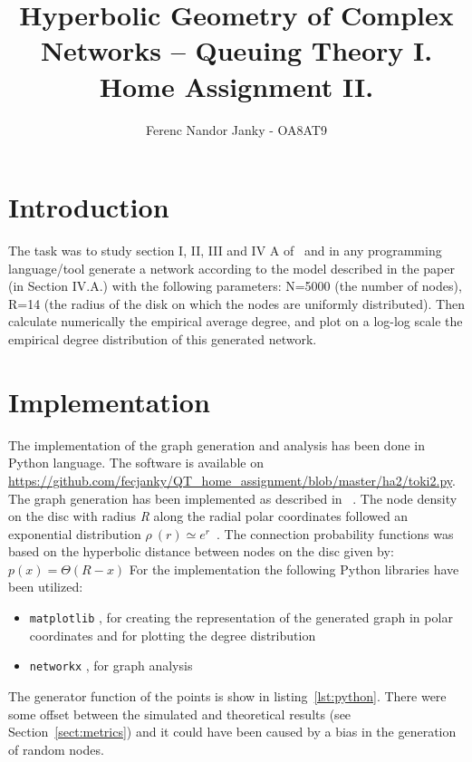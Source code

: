 \documentclass[a4paper]{article}
\title{Hyperbolic Geometry of Complex Networks – Queuing Theory I. Home Assignment II.}
\author{Ferenc Nandor Janky - OA8AT9}
\date{}
\begin{document}
\maketitle

\tableofcontents

\section{Introduction}

The task was to study section I, II, III and IV A of~\cite{HyperbolicGeoNetworks} and in any programming language/tool generate a network according to the model described in the paper 
(in Section IV.A.) with the following parameters: N=5000 (the number of nodes), R=14 (the radius of the disk on which the nodes are uniformly distributed). Then calculate numerically the empirical average degree, and plot on a log-log scale the empirical degree distribution of this generated network.

\section{Implementation}
The implementation of the graph generation and analysis has been done in Python language. The software is available on \url{https://github.com/fecjanky/QT_home_assignment/blob/master/ha2/toki2.py}.
The graph generation has been implemented as described in ~\cite{HyperbolicGeoNetworks}. The node density on the disc with radius \emph{R} along the radial polar coordinates followed an exponential distribution $ \rho~(r) \simeq e^r $~.
The connection probability functions was based on the hyperbolic distance between nodes on the disc given by: $ p(x) = \Theta(R - x) $
For the implementation the following Python libraries have been utilized:
\begin{itemize}
\item \verb!matplotlib! , for creating the representation of the generated graph in polar coordinates and for plotting the degree distribution
\item \verb!networkx! , for graph analysis
\end{itemize}

The  generator function of the points is show in listing~\ref{lst:python}. There were some offset between the simulated and theoretical results (see Section~\ref{sect:metrics}) and it could have been caused by a bias in the generation of random nodes.

\newpage
\end{document}
